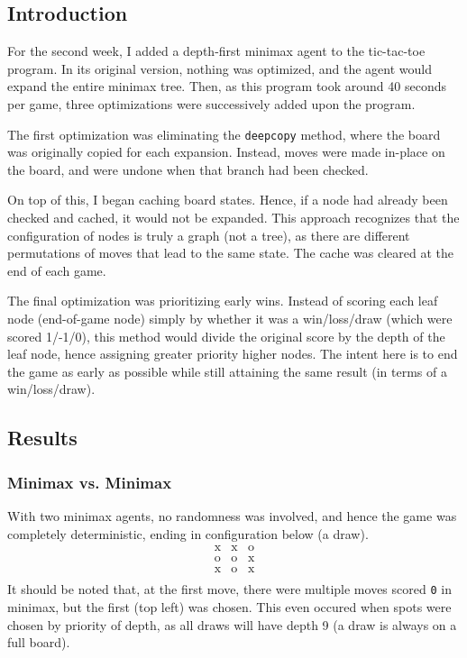 \documentclass[12pt]{article}
\begin{document}
\subsection*{Introduction}
For the second week, I added a depth-first minimax agent to the tic-tac-toe program. In its original version, nothing was optimized, and the agent would expand the entire minimax tree. Then, as this program took around 40 seconds per game, three optimizations were successively added upon the program.

The first optimization was eliminating the \texttt{deepcopy} method, where the board was originally copied for each expansion. Instead, moves were made in-place on the board, and were undone when that branch had been checked.

On top of this, I began caching board states. Hence, if a node had already been checked and cached, it would not be expanded. This approach recognizes that the configuration of nodes is truly a graph (not a tree), as there are different permutations of moves that lead to the same state. The cache was cleared at the end of each game.

The final optimization was prioritizing early wins. Instead of scoring each leaf node (end-of-game node) simply by whether it was a win/loss/draw (which were scored 1/-1/0), this method would divide the original score by the depth of the leaf node, hence assigning greater priority higher nodes. The intent here is to end the game as early as possible while still attaining the same result (in terms of a win/loss/draw).

\subsection*{Results}

\subsubsection*{Minimax vs. Minimax}
With two minimax agents, no randomness was involved, and hence the game was completely deterministic, ending in configuration below (a draw).
\[
    \begin{array}{c|c|c}
        \text{x} & \text{x} & \text{o}\\
        \hline
        \text{o} & \text{o} & \text{x}\\
        \hline
        \text{x} & \text{o} & \text{x}\\
    \end{array}    
\]
It should be noted that, at the first move, there were multiple moves scored \texttt{0} in minimax, but the first (top left) was chosen. This even occured when spots were chosen by priority of depth, as all draws will have depth 9 (a draw is always on a full board).
\end{document}
